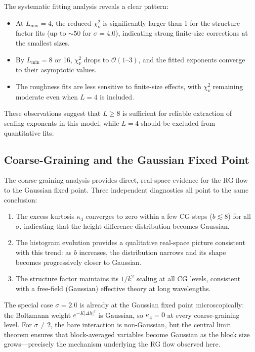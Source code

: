 \documentclass[11pt,a4paper]{article}
\begin{document}
The systematic fitting analysis reveals a clear pattern:
\begin{itemize}
\item At $L_{\min}=4$, the reduced $\chi^2_\nu$ is significantly larger
  than 1 for the structure factor fits (up to $\sim 50$ for $\sigma=4.0$),
  indicating strong finite-size corrections at the smallest sizes.
\item By $L_{\min}=8$ or 16, $\chi^2_\nu$ drops to $\mathcal{O}(1\text{--}3)$,
  and the fitted exponents converge to their asymptotic values.
\item The roughness fits are less sensitive to finite-size effects, with
  $\chi^2_\nu$ remaining moderate even when $L=4$ is included.
\end{itemize}

These observations suggest that $L\geq 8$ is sufficient for reliable
extraction of scaling exponents in this model, while $L=4$ should be
excluded from quantitative fits.

\subsection{Coarse-Graining and the Gaussian Fixed Point}

The coarse-graining analysis provides direct, real-space evidence for the
RG flow to the Gaussian fixed point.
Three independent diagnostics all point to the same conclusion:

\begin{enumerate}
\item The excess kurtosis $\kappa_4$ converges to zero within a few CG
  steps ($b\lesssim 8$) for all $\sigma$, indicating that the
  height difference distribution becomes Gaussian.

\item The histogram evolution provides a qualitative real-space picture
  consistent with this trend: as $b$ increases, the distribution narrows and
  its shape becomes progressively closer to Gaussian.

\item The structure factor maintains its $1/k^2$ scaling at all CG levels,
  consistent with a free-field (Gaussian) effective theory at long wavelengths.
\end{enumerate}

The special case $\sigma=2.0$ is already at the Gaussian fixed point
microscopically: the Boltzmann weight $e^{-K|\Delta h|^2}$ is Gaussian,
so $\kappa_4=0$ at every coarse-graining level.
For $\sigma\neq 2$, the bare interaction is non-Gaussian, but the
central limit theorem ensures that block-averaged variables become
Gaussian as the block size grows---precisely the mechanism underlying
the RG flow observed here.
\end{document}
